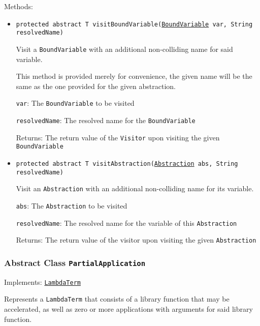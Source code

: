 Methods:
\begin{itemize}
\item \texttt{protected abstract T visitBoundVariable(\hyperref[type:edu.kit.wavelength.client.model.term.BoundVariable]{BoundVariable} var, String resolvedName)}

Visit a \texttt{BoundVariable} with an additional non-colliding name for said
 variable.
 
 This method is provided merely for convenience, the given name will be the
 same as the one provided for the given abstraction.

\texttt{var}: The \texttt{BoundVariable} to be visited

\texttt{resolvedName}: The resolved name for the \texttt{BoundVariable}

Returns: The return value of the \texttt{Visitor} upon visiting the given
         \texttt{BoundVariable}

\item \texttt{protected abstract T visitAbstraction(\hyperref[type:edu.kit.wavelength.client.model.term.Abstraction]{Abstraction} abs, String resolvedName)}

Visit an \texttt{Abstraction} with an additional non-colliding name for its
 variable.

\texttt{abs}: The \texttt{Abstraction} to be visited

\texttt{resolvedName}: The resolved name for the variable of this \texttt{Abstraction}

Returns: The return value of the visitor upon visiting the given
         \texttt{Abstraction}

\end{itemize}

\subsubsection{Abstract Class \texttt{PartialApplication}}
\label{type:edu.kit.wavelength.client.model.term.PartialApplication}
Implements: \texttt{\hyperref[type:edu.kit.wavelength.client.model.term.LambdaTerm]{LambdaTerm}}

Represents a \texttt{LambdaTerm} that consists of a library function that may
 be accelerated, as well as zero or more applications with arguments for said
 library function.

